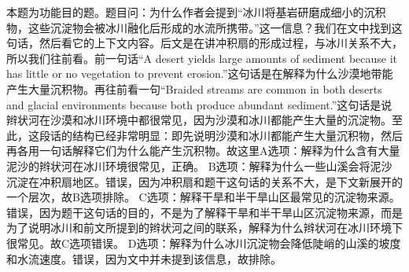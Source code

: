 \begin{blk}
    \begin{nlz}
        本题为功能目的题。题目问：为什么作者会提到“冰川将基岩研磨成细小的沉积物，这些沉淀物会被冰川融化后形成的水流所携带。”这一信息？我们在文中找到这句话，然后看它的上下文内容。后文是在讲冲积扇的形成过程，与冰川关系不大，所以我们往前看。前一句话“A desert yields large amounts of sediment because it has little or no vegetation to prevent erosion.”这句话是在解释为什么沙漠地带能产生大量沉积物。再往前看一句“Braided streams are common in both deserts and glacial environments because both produce abundant sediment.”这句话是说辫状河在沙漠和冰川环境中都很常见，因为沙漠和冰川都能产生大量的沉淀物。至此，这段话的结构已经非常明显：即先说明沙漠和冰川都能产生大量沉积物，然后再各用一句话解释它们为什么能产生沉积物。故这里A选项：解释为什么含有大量泥沙的辫状河在冰川环境很常见，正确。 B选项：解释为什么一些山溪会将泥沙沉淀在冲积扇地区。错误，因为冲积扇和题干这句话的关系不大，是下文新展开的一个层次，故B选项排除。 C选项：解释干旱和半干旱山区最常见的沉淀物来源。错误，因为题干这句话的目的，不是为了解释干旱和半干旱山区沉淀物来源，而是为了说明冰川和前文所提到的辫状河之间的联系，解释为什么辫状河在冰川环境下很常见。故C选项错误。 D选项：解释为什么冰川沉淀物会降低陡峭的山溪的坡度和水流速度。错误，因为文中并未提到该信息，故排除。
    \end{nlz}
\end{blk}

